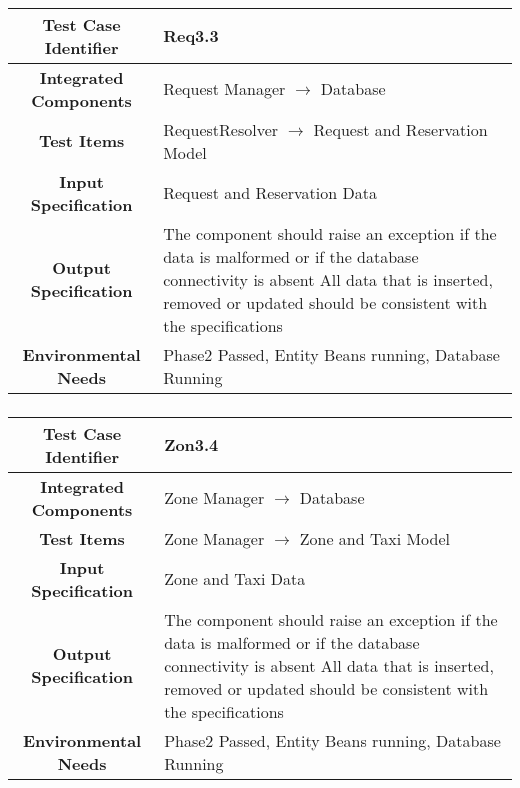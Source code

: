 \documentclass[11pt, a4paper,titlepage]{article}
\begin{document}
		\subsubsection{}
		\begin{tabularx}{\textwidth}{| c|X|}
			\hline \textbf{Test Case Identifier} & \label{Req3.3}Req3.3 \\
			\hline \textbf{Integrated Components} & Request Manager $\rightarrow $ Database \\
			\hline \textbf{Test Items} & RequestResolver $\rightarrow $ Request and Reservation Model \\
			\hline \textbf{Input Specification} & Request and Reservation Data \\
			\hline \textbf{Output Specification} & The component should raise an exception if the data is malformed or if the database connectivity is absent \newline
			All data that is inserted, removed or updated should be consistent with the specifications\\
			\hline \textbf{Environmental Needs} & Phase2 Passed, Entity Beans running, Database Running \\
			\hline
		\end{tabularx}
		\newline
		\subsubsection{}
		\begin{tabularx}{\textwidth}{| c|X|}
			\hline \textbf{Test Case Identifier} & \label{Zon3.4}Zon3.4 \\
			\hline \textbf{Integrated Components} & Zone Manager $\rightarrow $ Database \\
			\hline \textbf{Test Items} &  Zone Manager $\rightarrow $ Zone and Taxi Model \\
			\hline \textbf{Input Specification} & Zone and Taxi Data \\
			\hline \textbf{Output Specification} & The component should raise an exception if the data is malformed or if the database connectivity is absent \newline
			All data that is inserted, removed or updated should be consistent with the specifications\\
			\hline \textbf{Environmental Needs} & Phase2 Passed, Entity Beans running, Database Running \\
			\hline
		\end{tabularx}
		\newline
		\newpage
\end{document}
